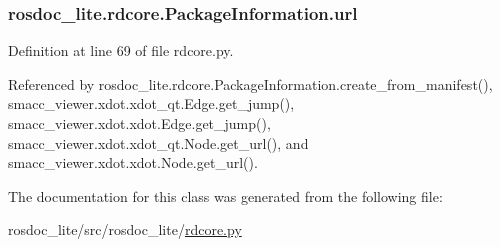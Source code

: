 \subsubsection[{\texorpdfstring{url}{url}}]{\setlength{\rightskip}{0pt plus 5cm}rosdoc\+\_\+lite.\+rdcore.\+Package\+Information.\+url}\hypertarget{classrosdoc__lite_1_1rdcore_1_1PackageInformation_a0ef2dba844b386398740004bc74d1bce}{}\label{classrosdoc__lite_1_1rdcore_1_1PackageInformation_a0ef2dba844b386398740004bc74d1bce}


Definition at line 69 of file rdcore.\+py.



Referenced by rosdoc\+\_\+lite.\+rdcore.\+Package\+Information.\+create\+\_\+from\+\_\+manifest(), smacc\+\_\+viewer.\+xdot.\+xdot\+\_\+qt.\+Edge.\+get\+\_\+jump(), smacc\+\_\+viewer.\+xdot.\+xdot.\+Edge.\+get\+\_\+jump(), smacc\+\_\+viewer.\+xdot.\+xdot\+\_\+qt.\+Node.\+get\+\_\+url(), and smacc\+\_\+viewer.\+xdot.\+xdot.\+Node.\+get\+\_\+url().



The documentation for this class was generated from the following file\+:\begin{DoxyCompactItemize}
\item 
rosdoc\+\_\+lite/src/rosdoc\+\_\+lite/\hyperlink{rdcore_8py}{rdcore.\+py}\end{DoxyCompactItemize}

